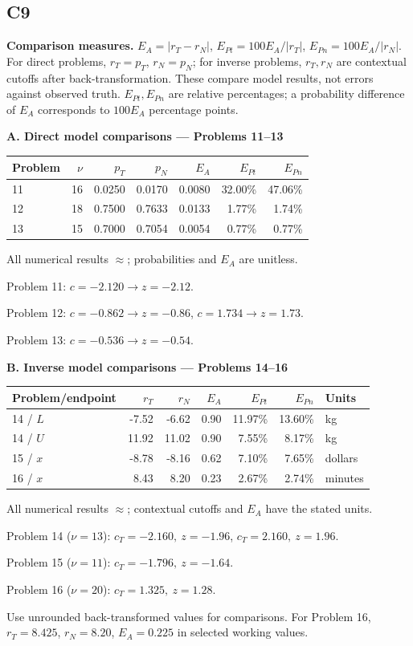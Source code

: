 \subsection*{C9}
\textbf{Comparison measures.}
$E_A=|r_T-r_N|$, $E_{Pt}=100E_A/|r_T|$,
$E_{Pn}=100E_A/|r_N|$.
For direct problems, $r_T=p_T$, $r_N=p_N$; for inverse problems, $r_T,r_N$
are contextual cutoffs after back-transformation. These compare model results,
not errors against observed truth. $E_{Pt},E_{Pn}$ are relative percentages;
a probability difference of $E_A$ corresponds to $100E_A$ percentage points.

\textbf{A. Direct model comparisons --- Problems 11--13}

\begin{tabularx}{\linewidth}{@{}Xrrrrrr@{}}
\toprule
Problem & $\nu$ & $p_T$ & $p_N$ & $E_A$ & $E_{Pt}$ & $E_{Pn}$\\
\midrule
11 & 16 & 0.0250 & 0.0170 & 0.0080 & 32.00\% & 47.06\%\\
12 & 18 & 0.7500 & 0.7633 & 0.0133 & 1.77\% & 1.74\%\\
13 & 15 & 0.7000 & 0.7054 & 0.0054 & 0.77\% & 0.77\%\\
\bottomrule
\end{tabularx}
All numerical results $\approx$; probabilities and $E_A$ are unitless.

Problem 11: $c=-2.120\to z=-2.12$.\par
Problem 12: $c=-0.862\to z=-0.86$, $c=1.734\to z=1.73$.\par
Problem 13: $c=-0.536\to z=-0.54$.\par
\medskip
\textbf{B. Inverse model comparisons --- Problems 14--16}

\begin{tabularx}{\linewidth}{@{}Xrrrrrl@{}}
\toprule
Problem/endpoint & $r_T$ & $r_N$ & $E_A$ & $E_{Pt}$ & $E_{Pn}$ & Units\\
\midrule
14 / $L$ & -7.52 & -6.62 & 0.90 & 11.97\% & 13.60\% & kg\\
14 / $U$ & 11.92 & 11.02 & 0.90 & 7.55\% & 8.17\% & kg\\
15 / $x$ & -8.78 & -8.16 & 0.62 & 7.10\% & 7.65\% & dollars\\
16 / $x$ & 8.43 & 8.20 & 0.23 & 2.67\% & 2.74\% & minutes\\
\bottomrule
\end{tabularx}
All numerical results $\approx$; contextual cutoffs and $E_A$ have the stated units.

Problem 14 ($\nu=13$): $c_T=-2.160,\ z=-1.96$, $c_T=2.160,\ z=1.96$.\par
Problem 15 ($\nu=11$): $c_T=-1.796,\ z=-1.64$.\par
Problem 16 ($\nu=20$): $c_T=1.325,\ z=1.28$.\par
Use unrounded back-transformed values for comparisons. For Problem 16, $r_T=8.425$, $r_N=8.20$, $E_A=0.225$ in selected working values.
